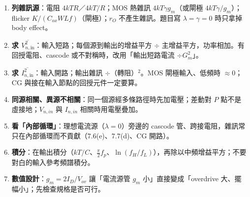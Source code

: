 \documentclass[11pt,a4paper]{article}
\newcommand{\Vsq}[1]{\overline{V^2_{n,\text{#1}}}}
\newcommand{\Isq}[1]{\overline{I^2_{n,\text{#1}}}}
\begin{document}
\begin{recipebox}[解題流程總整理]
\begin{enumerate}
  \item \textbf{列雜訊源}：電阻 $4kTR$／$4kT/R$；MOS 熱雜訊 $4kT\gamma g_m$（或閘極 $4kT\gamma/g_m$）；flicker $K/(C_{ox}WLf)$（閘極）；$r_O$ 不產生雜訊。題目寫 $\lambda=\gamma=0$ 時只拿掉 body effect。
  \item \textbf{求 $\Vsq{in}$}：輸入短路；每個源到輸出的增益平方 $\div$ 主增益平方，功率相加。有回授電阻、cascode 或不對稱時，改用「輸出短路電流 $\div G_m^2$」。
  \item \textbf{求 $\Isq{in}$}：輸入開路；輸出雜訊 $\div$（轉阻）$^2$。MOS 閘極輸入、低頻時 $\approx0$；CG 與接在輸入節點的回授元件一定要算。
  \item \textbf{同源相關、異源不相關}：同一個源經多條路徑時先加電壓；差動對 $P$ 點不是虛接地；$V_{n,in}$ 與 $I_{n,in}$ 相關時用電壓疊加。
  \item \textbf{看「內部循環」}：理想電流源（$\lambda=0$）旁邊的 cascode 管、跨接電阻，雜訊常只在內部循環而不貢獻（7.6(e)、7.7(d)、CG 開路）。
  \item \textbf{積分}：在輸出積分（$kT/C$、$\frac{\pi}{2}f_p$、$\ln(f_H/f_L)$），再除以中頻增益平方；不要對白的輸入參考頻譜積分。
  \item \textbf{數值設計}：$g_m=2I_D/V_{ov}$ 讓「電流源管 $g_m$ 小」直接變成「overdrive 大、擺幅小」；先檢查規格是否可行。
\end{enumerate}
\end{recipebox}
\end{document}
